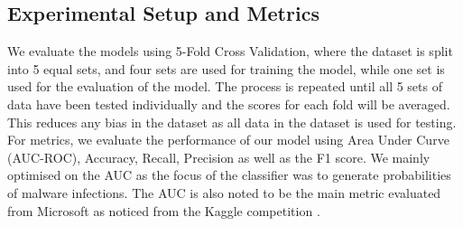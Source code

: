 \documentclass[runningheads]{llncs}
\begin{document}
\subsection{Experimental Setup and Metrics}We evaluate the models using 5-Fold Cross Validation, where the dataset is split into 5 equal sets, and four sets are used for training the model, while one set is used for the evaluation of the model. The process is repeated until all 5 sets of data have been tested individually and the scores for each fold will be averaged. This reduces any bias in the dataset as all data in the dataset is used for testing. For metrics, we evaluate the performance of our model using Area Under Curve (AUC-ROC), Accuracy, Recall, Precision as well as the F1 score. We mainly optimised on the AUC as the focus of the classifier was to generate probabilities of malware infections. The AUC is also noted to be the main metric evaluated from Microsoft as noticed from the Kaggle competition \cite{microsoft-malware-prediction}. 

\end{document}
